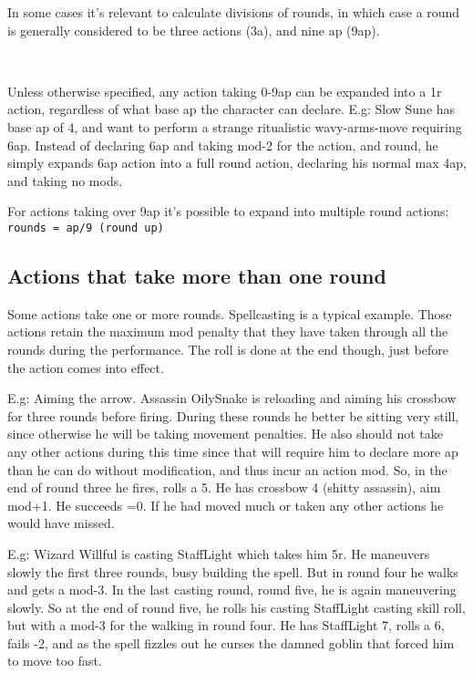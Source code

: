 In some cases it's relevant to calculate divisions of rounds, in which case a round is generally considered to be three actions (3a), and nine ap (9ap).


\

Unless otherwise specified, any action taking 0-9ap can be expanded into a 1r action, regardless of what base ap the character can declare. E.g: Slow Sune has base ap of 4, and want to perform a strange ritualistic wavy-arms-move requiring 6ap. Instead of declaring 6ap and taking mod-2 for the action, and round, he simply expands 6ap action into a full round action, declaring his normal max 4ap, and taking no mods.

For actions taking over 9ap it's possible to expand into multiple round actions:\\
\verb|rounds = ap/9 (round up)|


\subsection*{Actions that take more than one round}
\label{sec:multiroundactions}
Some actions take one or more rounds. Spellcasting is a typical example. Those actions retain the maximum mod penalty that they have taken through all the rounds during the performance. The roll is done at the end though, just before the action comes into effect.

E.g: Aiming the arrow. Assassin OilySnake is reloading and aiming his crossbow for three rounds before firing. During these rounds he better be sitting very still, since otherwise he will be taking movement penalties. He also should not take any other actions during this time since that will require him to declare more ap than he can do without modification, and thus incur an action mod. So, in the end of round three he fires, rolls a 5. He has crossbow 4 (shitty assassin), aim mod+1. He succeeds =0. If he had moved much or taken any other actions he would have missed.

E.g: Wizard Willful is casting StaffLight which takes him 5r. He maneuvers slowly the first three rounds, busy building the spell. But in round four he walks and gets a mod-3. In the last casting round, round five, he is again maneuvering slowly. So at the end of round five, he rolls his casting StaffLight casting skill roll, but with a mod-3 for the walking in round four. He has StaffLight 7, rolls a 6, fails -2, and as the spell fizzles out he curses the damned goblin that forced him to move too fast.












